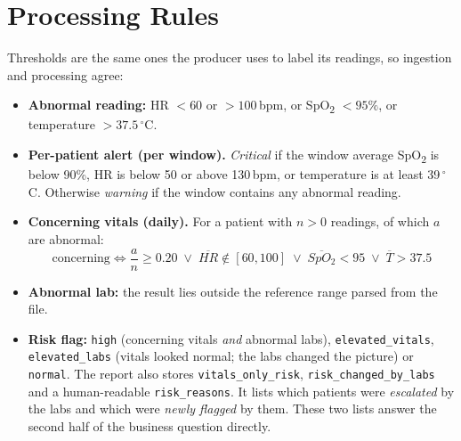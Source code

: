 \documentclass[11pt,a4paper]{article}
\newcommand{\code}[1]{\nolinkurl{#1}}
\begin{document}
\section{Processing Rules}\label{sec:rules}
Thresholds are the same ones the producer uses to label its readings, so ingestion and
processing agree:

\begin{itemize}
  \item \textbf{Abnormal reading:} HR $<60$ or $>100$\,bpm, or SpO\textsubscript{2} $<95\%$, or
  temperature $>37.5\,^\circ$C.
  \item \textbf{Per-patient alert (per window).} \emph{Critical} if the window average
  SpO\textsubscript{2} is below 90\%, HR is below 50 or above 130\,bpm, or temperature is at
  least 39\,$^\circ$C. Otherwise \emph{warning} if the window contains any abnormal reading.
  \item \textbf{Concerning vitals (daily).} For a patient with $n>0$ readings, of which $a$ are
  abnormal:
  \[
    \text{concerning} \iff \frac{a}{n} \ge 0.20 \;\lor\; \overline{HR}\notin[60,100] \;\lor\;
    \overline{SpO_2} < 95 \;\lor\; \overline{T} > 37.5
  \]
  \item \textbf{Abnormal lab:} the result lies outside the reference range parsed from the file.
  \item \textbf{Risk flag:} \code{high} (concerning vitals \emph{and} abnormal labs),
  \code{elevated_vitals}, \code{elevated_labs} (vitals looked normal; the labs changed the
  picture) or \code{normal}. The report also stores \code{vitals_only_risk},
  \code{risk_changed_by_labs} and a human-readable \code{risk_reasons}. It lists which patients
  were \emph{escalated} by the labs and which were \emph{newly flagged} by them. These two lists
  answer the second half of the business question directly.
\end{itemize}

\end{document}
